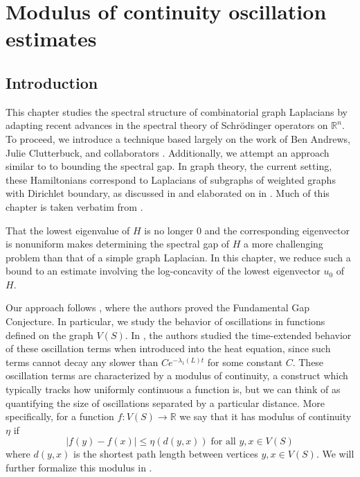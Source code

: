 \newcommand\numberthis{\addtocounter{equation}{1}\tag{\theequation}}

\let\ab\allowbreak

\chapter{Modulus of continuity oscillation estimates}\label{chap:MOC}

\section{Introduction} 
This chapter studies the spectral structure of combinatorial graph Laplacians by adapting recent advances in the spectral theory of Schr\"odinger operators on $\mathbb{R}^n$. To proceed, we introduce a technique based largely on the work of Ben Andrews, Julie Clutterbuck, and collaborators \cite{Andrews2011, andrews2012gradient, andrews2014moduli, andrews2013time, andrews2009lipschitz, andrews2013sharp}. Additionally, we attempt an approach similar to \cite{Andrews2011} to bounding the spectral gap. In graph theory, the current setting, these Hamiltonians correspond to Laplacians of subgraphs of weighted graphs with Dirichlet boundary, as discussed in  and elaborated on in \cite{Chung}. Much of this chapter is taken verbatim from \cite{Jarret2015}.

 That the lowest eigenvalue of $H$ is no longer $0$ and the corresponding eigenvector is nonuniform makes determining the spectral gap of $H$ a more challenging problem than that of a simple graph Laplacian. In this chapter, we reduce such a bound to an estimate involving the log-concavity of the lowest eigenvector $u_0$ of $H$. 

Our approach follows \cite{Andrews2011}, where the authors proved the Fundamental Gap Conjecture. In particular, we study the behavior of oscillations in functions defined on the graph $V(S)$. In \cite{Andrews2011}, the authors studied the time-extended behavior of these oscillation terms when introduced into the heat equation, since such terms cannot decay any slower than $C e^{-\lambda_1(L)t}$ for some constant $C$. These oscillation terms are characterized by a modulus of continuity, a construct which typically tracks how uniformly continuous a function is, but we can think of as quantifying the size of oscillations separated by a particular distance. More specifically, for a function $f:V(S)\longrightarrow \mathbb{R}$ we say that it has modulus of continuity $\eta$ if
\begin{equation*}
	\lvert f(y)-f(x) \rvert  \leq \eta(d(y,x)) \; \text{for all $y,x \in V(S)$} 
\end{equation*}
where $d(y,x)$ is the shortest path length between vertices $y,x \in V(S)$. We will further formalize this modulus in .


